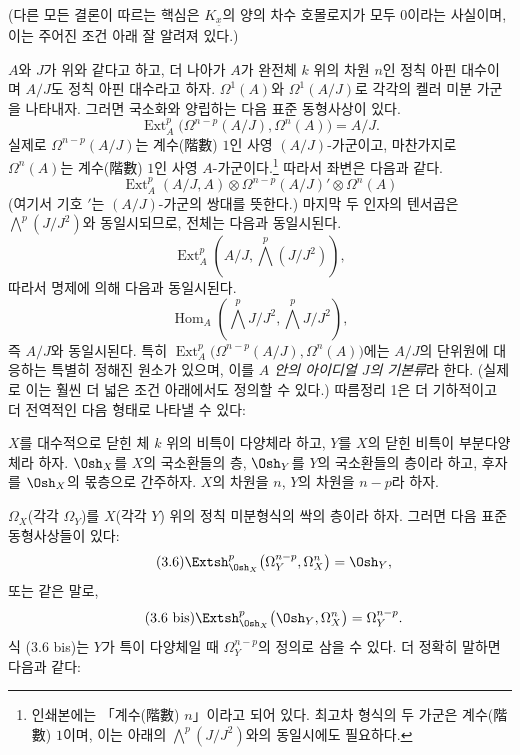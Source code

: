 (다른 모든 결론이 따르는 핵심은 $K_{\underline{x}}$의 양의 차수
호몰로지가 모두 $0$이라는 사실이며, 이는 주어진 조건 아래 잘 알려져 있다.)

 $A$와 $J$가 위와 같다고 하고, 더 나아가
$A$가 완전체 $k$ 위의 차원 $n$인 정칙 아핀 대수이며
$A/J$도 정칙 아핀 대수라고 하자. $\Omega^{1}(A)$와
$\Omega^{1}(A/J)$로 각각의 켈러 미분 가군을 나타내자. 그러면
국소화와 양립하는 다음 표준 동형사상이 있다.
\begin{equation}\tag{3.5}
  \operatorname{Ext}_{A}^{p}\bigl(\Omega^{n-p}(A/J),\Omega^{n}(A)\bigr)=A/J.
\end{equation}
실제로 $\Omega^{n-p}(A/J)$는 계수(階數) $1$인 사영 $(A/J)$-가군이고, 마찬가지로
$\Omega^{n}(A)$는 계수(階數) $1$인 사영 $A$-가군이다.\footnote{인쇄본에는
「계수(階數) $n$」이라고 되어 있다. 최고차 형식의 두 가군은 계수(階數)
$1$이며, 이는 아래의 $\bigwedge^{p}(J/J^{2})$와의 동일시에도 필요하다.}
따라서 좌변은 다음과 같다.
\[
  \operatorname{Ext}_{A}^{p}(A/J,A)
  \otimes\Omega^{n-p}(A/J)'\otimes\Omega^{n}(A)
\]
(여기서 기호 $'$는 $(A/J)$-가군의 쌍대를 뜻한다.) 마지막 두 인자의
텐서곱은 $\bigwedge^{p}(J/J^{2})$와 동일시되므로, 전체는
다음과 동일시된다.
\[
  \operatorname{Ext}_{A}^{p}\!\left(A/J,\bigwedge^{p}(J/J^{2})\right),
\]
따라서 명제에 의해 다음과 동일시된다.
\[
  \operatorname{Hom}_{A}\!\left(\bigwedge^{p}J/J^{2},
  \bigwedge^{p}J/J^{2}\right),
\]
즉 $A/J$와 동일시된다. 특히
$\operatorname{Ext}_{A}^{p}\bigl(\Omega^{n-p}(A/J),\Omega^{n}(A)\bigr)$에는
$A/J$의 단위원에 대응하는 특별히 정해진 원소가 있으며, 이를
\emph{$A$ 안의 아이디얼 $J$의 기본류}라 한다. (실제로 이는
훨씬 더 넓은 조건 아래에서도 정의할 수 있다.) 따름정리 1은
더 기하적이고 더 전역적인 다음 형태로 나타낼 수 있다:

 $X$를 대수적으로 닫힌 체 $k$ 위의 비특이
다양체라 하고, $Y$를 $X$의 닫힌 비특이 부분다양체라 하자.
$\Osh_X$를 $X$의 국소환들의 층, $\Osh_Y$를 $Y$의 국소환들의 층이라
하고, 후자를 $\Osh_X$의 몫층으로 간주하자. $X$의 차원을 $n$,
$Y$의 차원을 $n-p$라 하자.

$\Omega_X$(각각 $\Omega_Y$)를 $X$(각각 $Y$) 위의 정칙
미분형식의 싹의 층이라 하자. 그러면 다음 표준 동형사상들이
있다:
\begin{equation}\tag{3.6}
  \Extsh_{\Osh_X}^{p}\bigl(\Omega_Y^{n-p},\Omega_X^{n}\bigr)=\Osh_Y,
\end{equation}
또는 같은 말로,
\begin{equation}\tag{3.6 bis}
  \Extsh_{\Osh_X}^{p}\bigl(\Osh_Y,\Omega_X^{n}\bigr)=\Omega_Y^{n-p}.
\end{equation}
식 (3.6 bis)는 $Y$가 특이 다양체일 때 $\Omega_Y^{n-p}$의 정의로
삼을 수 있다. 더 정확히 말하면 다음과 같다:

